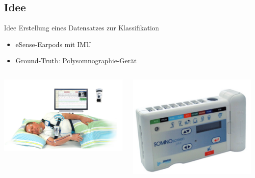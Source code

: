 \documentclass[18pt]{beamer}
\begin{document}
\subsection{Idee}
\begin{frame}{Idee}
Erstellung eines Datensatzes zur Klassifikation
\begin{itemize}
    \item eSense-Earpods mit IMU
    \item Ground-Truth: Polysomnographie-Gerät
\end{itemize}

\begin{center}
    \begin{columns}
        \begin{column}{.6\textwidth}
           \includegraphics[scale=0.25]{images/study/psg_system_flow}
        \end{column}
        \begin{column}{.39\textwidth}
           \includegraphics[scale=0.16]{images/study/psg_system_picture} 
        \end{column}
    \end{columns}
\end{center}
\end{frame}
\end{document}
